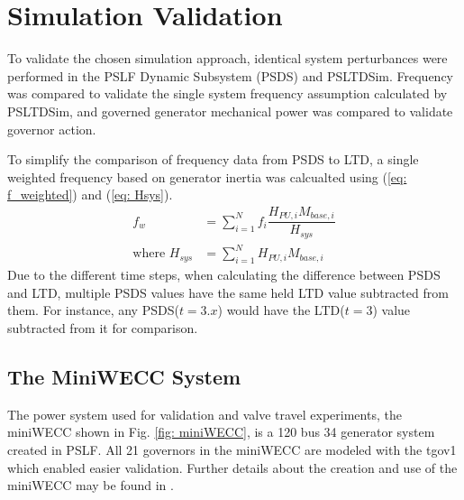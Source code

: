 \section{Simulation Validation}
To validate the chosen simulation approach, identical system perturbances were performed in the PSLF Dynamic Subsystem (PSDS) and PSLTDSim.
Frequency was compared to validate the single system frequency assumption calculated by PSLTDSim, and governed generator mechanical power was compared to validate governor action.

To simplify the comparison of frequency data from PSDS to LTD, a single weighted frequency based on generator inertia was calcualted using (\ref{eq: f_weighted}) and (\ref{eq: Hsys}).
\begin{align}
f_{w} &= \sum_{i=1}^{N} f_i \dfrac{H_{PU, i} M_{base, i} }{H_{sys}}  \label{eq: f_weighted}\\
\text{where } H_{sys} &= \sum_{i=1}^{N} H_{PU, i} M_{base, i}  \label{eq: Hsys}
\end{align}%
Due to the different time steps, when calculating the difference between PSDS and LTD, multiple PSDS values have the same held LTD value subtracted from them. 
For instance, any PSDS($t = 3.x$) would have the LTD($t = 3$) value subtracted from it for comparison.


\subsection{The MiniWECC System}

The power system used for validation and valve travel experiments, the miniWECC shown in Fig. \ref{fig: miniWECC}, is a 120 bus 34 generator system created in PSLF.
All 21 governors in the miniWECC are modeled with the tgov1 which enabled easier validation.
Further details about the creation and use of the miniWECC may be found in \cite{trudnowski2012, sandia2015, RJminiWECC}.


